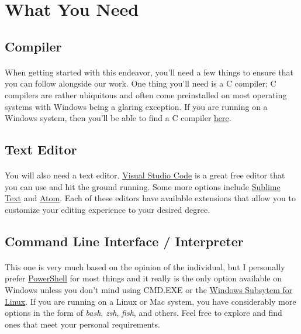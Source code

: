 \section{What You Need}
   \subsection{Compiler}
   \paragraph{}
      When getting started with this endeavor, you'll need a few things to ensure that you can follow alongside our work. One thing you'll need is a C
      compiler; C compilers are rather ubiquitous and often come preinstalled on most operating systems with Windows being a glaring exception. If you
      are running on a Windows system, then you'll be able to find a C compiler \href{https://github.com/llvm/llvm-project/releases/download/llvmorg-12.0.1/LLVM-12.0.1-win64.exe}{here}.

   \subsection{Text Editor}
   \paragraph{}
      You will also need a text editor. \href{https://code.visualstudio.com}{Visual Studio Code} is a great free editor that you can use and hit the
      ground running. Some more options include \href{https://sublimetext.com}{Sublime Text} and \href{https://atom.io}{Atom}. Each of these editors have
      available extensions that allow you to customize your editing experience to your desired degree.

   \subsection{Command Line Interface / Interpreter}
   \paragraph{}
      This one is very much based on the opinion of the individual, but I personally prefer \href{https://docs.microsoft.com/en-us/powershell}{PowerShell} for most things and it really is the only option
      available on Windows unless you don't mind using CMD.EXE or the \href{https://docs.microsoft.com/en-us/windows/wsl/about}{Windows Subsytem for Linux}.
      If you are running on a Linux or Mac system, you have considerably more options in the form of \textit{bash}, \textit{zsh}, \textit{fish}, and others.
      Feel free to explore and find ones that meet your personal requirements.
